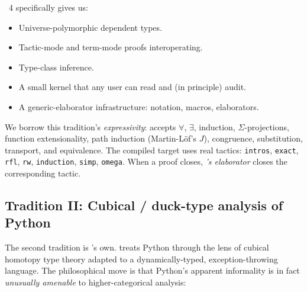 \Lean{}~4 specifically gives us:
\begin{itemize}[leftmargin=1.7em]
  \item Universe-polymorphic dependent types.
  \item Tactic-mode and term-mode proofs interoperating.
  \item Type-class inference.
  \item A small kernel that any user can read and (in principle)
    audit.
  \item A generic-elaborator infrastructure: notation, macros,
    elaborators.
\end{itemize}

We borrow this tradition's \emph{expressivity}: \PSDL{} accepts
$\forall$, $\exists$, induction, $\Sigma$-projections, function
extensionality, path induction (Martin-L\"of's $J$), congruence,
substitution, transport, and equivalence.  The compiled \Lean{}
target uses real \Lean{} tactics: \texttt{intros}, \texttt{exact},
\texttt{rfl}, \texttt{rw}, \texttt{induction}, \texttt{simp},
\texttt{omega}.  When a \PSDL{} proof closes, \emph{\Lean's
elaborator} closes the corresponding tactic.

\subsection*{Tradition II: Cubical / duck-type analysis of Python}

The second tradition is \Deppy{}'s own.  \Deppy{} treats Python through
the lens of cubical homotopy type theory \citep{HoTT, CCHM} adapted
to a dynamically-typed, exception-throwing language.  The
philosophical move is that Python's apparent informality is in fact
\emph{unusually amenable} to higher-categorical analysis:

